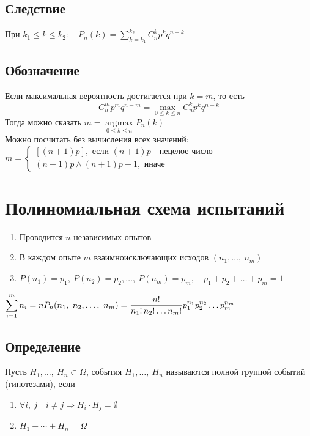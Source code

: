 \documentclass[12pt, a4paper]{article}
\begin{document}
    \subsection*{Следствие}
    При $k_1 \leq k \leq k_2:\quad P_n(k) = \displaystyle\sum_{k = k_1}^{k_2}C_n^k p^k q^{n - k}$\\
    \subsection*{Обозначение}
    Если максимальная вероятность достигается при $k = m$, то есть 
    \[C_n^m p^m q^{n - m} = \max\limits_{0\leq k \leq n} C_n^k p^k q^{n - k}\]
    Тогда можно сказать $m = \underset{0 \leq k \leq n}{\operatorname{argmax}} P_n(k)$\\
    Можно посчитать без вычисления всех значений:\\
    $m = \begin{cases}
        [(n + 1) p], \text{ если $(n + 1)p$ - нецелое число}\\
        (n + 1)p \wedge (n + 1)p - 1, \text{ иначе}
    \end{cases}$
    \section*{Полиномиальная схема испытаний}
    \begin{enumerate}
        \item Проводится $n$ независимых опытов
        \item В каждом опыте $m$ взаимноисключающих исходов $(n_1,\dots,\ n_m)$
        \item  $P(n_1) = p_1,\ P(n_2) = p_2,\dots,\ P(n_m) = p_m,\quad p_1 + p_2 + \dots + p_m = 1$
    \end{enumerate}
    $\displaystyle\sum_{i = 1}^{m}  n_i = n\\
    P_n(n_1,\ n_2,\dots,\ n_m) = \frac{n!}{n_1!\, n_2!\dots n_m!}p_1^{n_1}p_2^{n_2}\dots p_m^{n_m}$
    \subsection*{Определение}
    Пусть $H_1,\dots,\ H_n\subset \Omega$, события $H_1,\dots,\ H_n$ называются полной группой событий (гипотезами), если
    \begin{enumerate}
        \item $\forall i,\ j\quad i\neq j\Rightarrow H_i\cdot H_j  = \emptyset$
        \item $H_1 + \cdots + H_n = \Omega$
    \end{enumerate}
\end{document}
